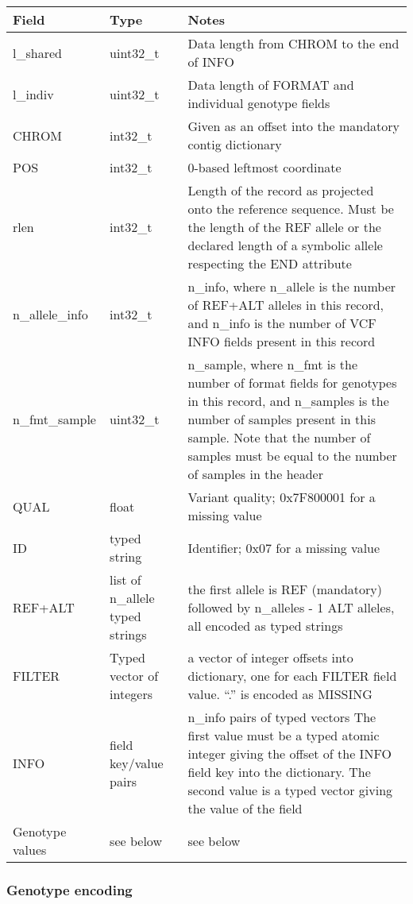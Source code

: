 \documentclass[8pt]{article}
\begin{document}
{\small
\begin{tabular}{|l | l | p{30em} | } \hline
\textbf{Field} &	\textbf{Type} &	\textbf{Notes} \\ \hline
l\_shared &	uint32\_t &	Data length from CHROM to the end of INFO \\ \hline
l\_indiv  &	uint32\_t &	Data length of FORMAT and individual genotype fields \\ \hline
CHROM	  & int32\_t  &	Given as an offset into the mandatory contig dictionary \\ \hline
POS	      & int32\_t  &	0-based leftmost coordinate \\ \hline
rlen      &	int32\_t  &	Length of the record as projected onto the reference sequence. Must be the length of the REF allele or the declared length of a symbolic allele respecting the END attribute \\ \hline
n\_allele\_info	& int32\_t	& n\_info, where n\_allele is the number of REF+ALT alleles in this record, and n\_info is the number of VCF INFO fields present in this record \\ \hline
n\_fmt\_sample	& uint32\_t	& n\_sample, where n\_fmt is the number of format fields for genotypes in this record, and n\_samples is the number of samples present in this sample.  Note that the number of samples must be equal to the number of samples in the header \\ \hline
QUAL	  & float	  & Variant quality; 0x7F800001 for a missing value \\ \hline
ID	      & typed string & Identifier; 0x07 for a missing value \\ \hline
REF+ALT   & list of n\_allele typed strings & the first allele is REF (mandatory) followed by n\_alleles - 1 ALT alleles, all encoded as typed strings \\ \hline
FILTER	  & Typed vector of integers	& a vector of integer offsets into dictionary, one for each FILTER field value.  ``.'' is encoded as MISSING \\ \hline
INFO      & field key/value pairs	    & n\_info pairs of typed vectors	The first value must be a typed atomic integer giving the offset of the INFO field key into the dictionary.  The second value is a typed vector giving the value of the field \\ \hline
Genotype values &	see below	& see below \\ \hline
\end{tabular}}

\subsubsection{Genotype encoding}
\end{document}
